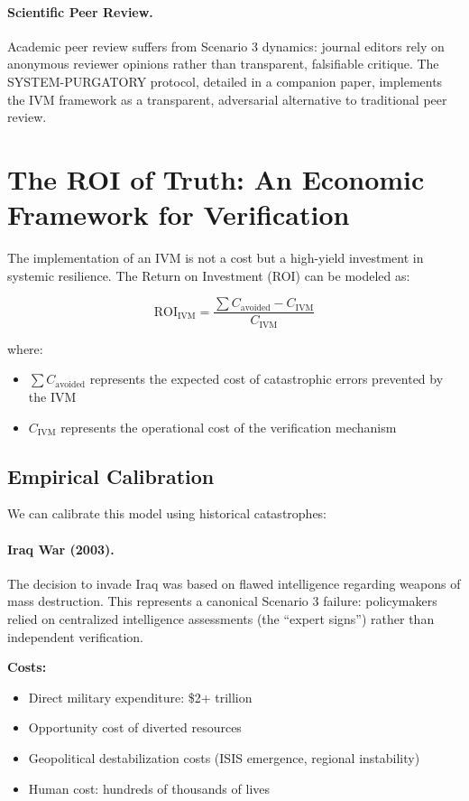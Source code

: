\documentclass[11pt,a4paper]{article}
\begin{document}
\paragraph{Scientific Peer Review.} Academic peer review suffers from Scenario 3 dynamics: journal editors rely on anonymous reviewer opinions rather than transparent, falsifiable critique. The SYSTEM-PURGATORY protocol, detailed in a companion paper, implements the IVM framework as a transparent, adversarial alternative to traditional peer review.

\section{The ROI of Truth: An Economic Framework for Verification}

The implementation of an IVM is not a cost but a high-yield investment in systemic resilience. The Return on Investment (ROI) can be modeled as:

\begin{equation}
\text{ROI}_{\text{IVM}} = \frac{\sum C_{\text{avoided}} - C_{\text{IVM}}}{C_{\text{IVM}}}
\end{equation}

where:
\begin{itemize}
    \item $\sum C_{\text{avoided}}$ represents the expected cost of catastrophic errors prevented by the IVM
    \item $C_{\text{IVM}}$ represents the operational cost of the verification mechanism
\end{itemize}

\subsection{Empirical Calibration}

We can calibrate this model using historical catastrophes:

\paragraph{Iraq War (2003).} The decision to invade Iraq was based on flawed intelligence regarding weapons of mass destruction. This represents a canonical Scenario 3 failure: policymakers relied on centralized intelligence assessments (the ``expert signs'') rather than independent verification.

\textbf{Costs:}
\begin{itemize}
    \item Direct military expenditure: \$2+ trillion
    \item Opportunity cost of diverted resources
    \item Geopolitical destabilization costs (ISIS emergence, regional instability)
    \item Human cost: hundreds of thousands of lives
\end{itemize}
\end{document}
